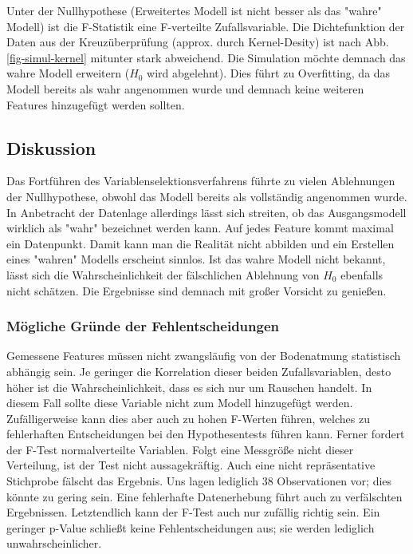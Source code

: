 Unter der Nullhypothese (Erweitertes Modell ist nicht besser als das "wahre" Modell) ist die F-Statistik eine F-verteilte Zufallsvariable.
Die Dichtefunktion der Daten aus der Kreuzüberprüfung (approx. durch Kernel-Desity) ist nach Abb. \ref{fig-simul-kernel} mitunter stark abweichend.
Die Simulation möchte demnach das wahre Modell erweitern ($H_0$ wird abgelehnt).
Dies führt zu Overfitting, da das Modell bereits als wahr angenommen wurde und demnach keine weiteren Features hinzugefügt werden sollten.

\subsection{Diskussion}
Das Fortführen des Variablenselektionsverfahrens führte zu vielen Ablehnungen der Nullhypothese, obwohl das Modell bereits als vollständig angenommen wurde.
In Anbetracht der Datenlage allerdings lässt sich streiten, ob das Ausgangsmodell wirklich als "wahr" bezeichnet werden kann.
Auf jedes Feature kommt maximal ein Datenpunkt.
Damit kann man die Realität nicht abbilden und ein Erstellen eines "wahren" Modells erscheint sinnlos.
Ist das wahre Modell nicht bekannt, lässt sich die Wahrscheinlichkeit der fälschlichen Ablehnung von $H_0$ ebenfalls nicht schätzen.
Die Ergebnisse sind demnach mit großer Vorsicht zu genießen.

\subsubsection{Mögliche Gründe der Fehlentscheidungen}
Gemessene Features müssen nicht zwangsläufig von der Bodenatmung statistisch abhängig sein.
Je geringer die Korrelation dieser beiden Zufallsvariablen, desto höher ist die Wahrscheinlichkeit, dass es sich nur um Rauschen handelt.
In diesem Fall sollte diese Variable nicht zum Modell hinzugefügt werden.
Zufälligerweise kann dies aber auch zu hohen F-Werten führen, welches zu fehlerhaften Entscheidungen bei den Hypothesentests führen kann.
Ferner fordert der F-Test normalverteilte Variablen.
Folgt eine Messgröße nicht dieser Verteilung, ist der Test nicht aussagekräftig.
Auch eine nicht repräsentative Stichprobe fälscht das Ergebnis.
Uns lagen lediglich 38 Observationen vor; dies könnte zu gering sein.
Eine fehlerhafte Datenerhebung führt auch zu verfälschten Ergebnissen.
Letztendlich kann der F-Test auch nur zufällig richtig sein.
Ein geringer p-Value schließt keine Fehlentscheidungen aus; sie werden lediglich unwahrscheinlicher.

